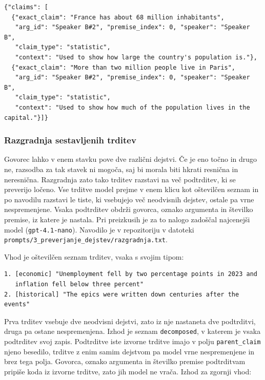 \documentclass[a4paper, 12pt]{book}
\begin{document}
\begin{lstlisting}[basicstyle=\ttfamily\scriptsize,breaklines=true]
{"claims": [
  {"exact_claim": "France has about 68 million inhabitants",
   "arg_id": "Speaker B#2", "premise_index": 0, "speaker": "Speaker B",
   "claim_type": "statistic",
   "context": "Used to show how large the country's population is."},
  {"exact_claim": "More than two million people live in Paris",
   "arg_id": "Speaker B#2", "premise_index": 0, "speaker": "Speaker B",
   "claim_type": "statistic",
   "context": "Used to show how much of the population lives in the capital."}]}
\end{lstlisting}

\subsubsection{Razgradnja sestavljenih trditev}
\label{ssec:clustering}

Govorec lahko v enem stavku pove dve različni dejstvi. Če je eno točno in drugo ne, razsodba za tak stavek ni mogoča, saj bi morala biti hkrati resnična in neresnična. Razgradnja zato tako trditev razstavi na več podtrditev, ki se preverijo ločeno. Vse trditve model prejme v enem klicu kot oštevilčen seznam in po navodilu razstavi le tiste, ki vsebujejo več neodvisnih dejstev, ostale pa vrne nespremenjene. Vsaka podtrditev obdrži govorca, oznako argumenta in številko premise, iz katere je nastala. Pri preizkusih je za to nalogo zadoščal najcenejši model (\texttt{gpt-4.1-nano}). Navodilo je v repozitoriju v datoteki \texttt{prompts/3\_preverjanje\_dejstev/razgradnja.txt}.

Vhod je oštevilčen seznam trditev, vsaka s svojim tipom:

\begin{lstlisting}[basicstyle=\ttfamily\scriptsize,breaklines=true]
1. [economic] "Unemployment fell by two percentage points in 2023 and
   inflation fell below three percent"
2. [historical] "The epics were written down centuries after the events"
\end{lstlisting}

Prva trditev vsebuje dve neodvisni dejstvi, zato iz nje nastaneta dve podtrditvi, druga pa ostane nespremenjena. Izhod je seznam \texttt{decomposed}, v katerem je vsaka podtrditev svoj zapis. Podtrditve iste izvorne trditve imajo v polju \texttt{parent\_claim} njeno besedilo, trditve z enim samim dejstvom pa model vrne nespremenjene in brez tega polja. Govorca, oznako argumenta in številko premise podtrditvam pripiše koda iz izvorne trditve, zato jih model ne vrača. Izhod za zgornji vhod:
\end{document}
